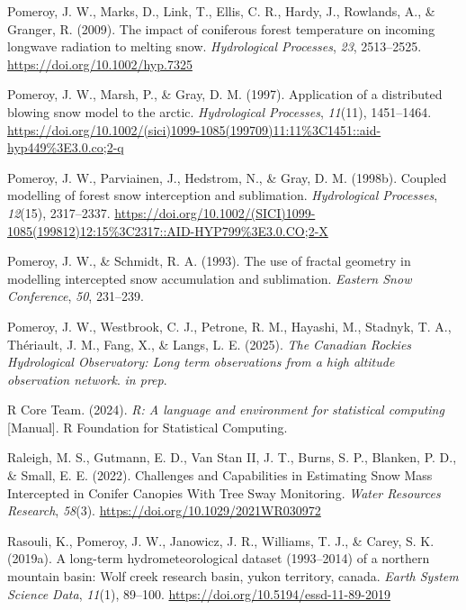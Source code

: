 \documentclass[
  letterpaper,
]{tex/uofsthesis-cs}
\newlength{\cslhangindent}
\newenvironment{CSLReferences}[2] %
 {\begin{list}{}{%
  \setlength{\itemindent}{0pt}
  \setlength{\leftmargin}{0pt}
  \setlength{\parsep}{0pt}
  \ifodd #1
   \setlength{\leftmargin}{\cslhangindent}
   \setlength{\itemindent}{-1\cslhangindent}
  \fi
  \setlength{\itemsep}{#2\baselineskip}}}
 {\end{list}}
\begin{document}
\begin{CSLReferences}{1}{0}
Pomeroy, J. W., Marks, D., Link, T., Ellis, C. R., Hardy, J., Rowlands,
A., \& Granger, R. (2009). The impact of coniferous forest temperature
on incoming longwave radiation to melting snow. \emph{Hydrological
Processes}, \emph{23}, 2513--2525.
\url{https://doi.org/10.1002/hyp.7325}

Pomeroy, J. W., Marsh, P., \& Gray, D. M. (1997). Application of a
distributed blowing snow model to the arctic. \emph{Hydrological
Processes}, \emph{11}(11), 1451--1464.
\url{https://doi.org/10.1002/(sici)1099-1085(199709)11:11\%3C1451::aid-hyp449\%3E3.0.co;2-q}

Pomeroy, J. W., Parviainen, J., Hedstrom, N., \& Gray, D. M. (1998b).
Coupled modelling of forest snow interception and sublimation.
\emph{Hydrological Processes}, \emph{12}(15), 2317--2337.
\url{https://doi.org/10.1002/(SICI)1099-1085(199812)12:15\%3C2317::AID-HYP799\%3E3.0.CO;2-X}

Pomeroy, J. W., \& Schmidt, R. A. (1993). The use of fractal geometry in
modelling intercepted snow accumulation and sublimation. \emph{Eastern
Snow Conference}, \emph{50}, 231--239.

Pomeroy, J. W., Westbrook, C. J., Petrone, R. M., Hayashi, M., Stadnyk,
T. A., Thériault, J. M., Fang, X., \& Langs, L. E. (2025). \emph{The
{Canadian Rockies Hydrological Observatory}: Long term observations from
a high altitude observation network}. \emph{in prep}.

R Core Team. (2024). \emph{R: A language and environment for statistical
computing} {[}Manual{]}. R Foundation for Statistical Computing.

Raleigh, M. S., Gutmann, E. D., Van Stan II, J. T., Burns, S. P.,
Blanken, P. D., \& Small, E. E. (2022). Challenges and {Capabilities} in
{Estimating Snow Mass Intercepted} in {Conifer Canopies With Tree Sway
Monitoring}. \emph{Water Resources Research}, \emph{58}(3).
\url{https://doi.org/10.1029/2021WR030972}

Rasouli, K., Pomeroy, J. W., Janowicz, J. R., Williams, T. J., \& Carey,
S. K. (2019a). A long-term hydrometeorological dataset (1993--2014) of a
northern mountain basin: {Wolf} creek research basin, yukon territory,
canada. \emph{Earth System Science Data}, \emph{11}(1), 89--100.
\url{https://doi.org/10.5194/essd-11-89-2019}


\end{CSLReferences}
\end{document}
